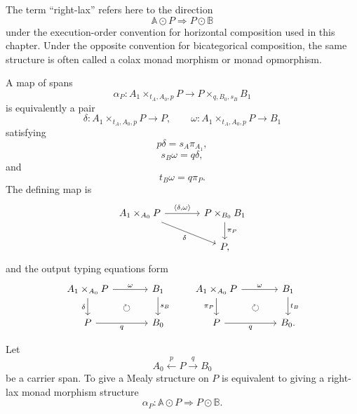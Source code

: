 \begin{remark}[Terminology]
\label{rem:to-lax-terminology}
    The term ``right-lax'' refers here to the direction
    \[
        \mathbb A\odot P
        \Longrightarrow
        P\odot\mathbb B
    \]
    under the execution-order convention for horizontal composition used in
    this chapter. Under the opposite convention for bicategorical
    composition, the same structure is often called a colax monad morphism or
    monad opmorphism.
\end{remark}

A map of spans
\[
    \alpha_P:
    A_1\times_{t_A,A_0,p}P
    \longrightarrow
    P\times_{q,B_0,s_B}B_1
\]
is equivalently a pair
\[
    \delta:
    A_1\times_{t_A,A_0,p}P\to P,
    \qquad
    \omega:
    A_1\times_{t_A,A_0,p}P\to B_1
\]
satisfying
\[
    p\delta=s_A\pi_{A_1},
\]
\[
    s_B\omega=q\delta,
\]
and
\[
    t_B\omega=q\pi_P.
\]
The defining map is
\[
\begin{tikzcd}[column sep=large]
    A_1\times_{A_0}P
        \arrow[r, "{\langle\delta,\omega\rangle}"]
        \arrow[dr, "\delta"']
    &
    P\times_{B_0}B_1
        \arrow[d, "\pi_P"]
    \\
    &
    P,
\end{tikzcd}
\]
and the output typing equations form
\[
\begin{tikzcd}[column sep=large]
    A_1\times_{A_0}P
        \arrow[r, "\omega"]
        \arrow[d, "\delta"']
        \arrow[dr, phantom, "\circlearrowright"]
    &
    B_1
        \arrow[d, "s_B"]
    \\
    P
        \arrow[r, "q"']
    &
    B_0
\end{tikzcd}
\qquad
\begin{tikzcd}[column sep=large]
    A_1\times_{A_0}P
        \arrow[r, "\omega"]
        \arrow[d, "\pi_P"']
        \arrow[dr, phantom, "\circlearrowright"]
    &
    B_1
        \arrow[d, "t_B"]
    \\
    P
        \arrow[r, "q"']
    &
    B_0.
\end{tikzcd}
\]

\begin{theorem}
\label{thm:to-mealy-lax-monad-morphisms}
    Let
    \[
        A_0\xleftarrow{p}P\xrightarrow{q}B_0
    \]
    be a carrier span. To give a Mealy structure on \(P\) is equivalent to
    giving a right-lax monad morphism structure
    \[
        \alpha_P:
        \mathbb A\odot P
        \Longrightarrow
        P\odot\mathbb B.
    \]
\end{theorem}

